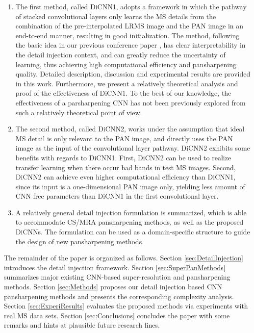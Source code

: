 \documentclass[journal]{IEEEtran}
\begin{document}
\begin{enumerate}
\item The first method, called DiCNN1, adopts a framework in which the pathway of stacked convolutional layers only learns the MS details from the combination of the pre-interpolated LRMS image and the PAN image in an end-to-end manner, resulting in good initialization. The method, following the basic idea in our previous conference paper \cite{rao2017residual}, has clear interpretability in the detail injection context, and can greatly reduce the uncertainty of learning, thus achieving high computational efficiency and pansharpening quality. Detailed description, discussion and experimental results are provided in this work. Furthermore, we present a relatively theoretical analysis and proof of the effectiveness of DiCNN1. To the best of our knowledge, the effectiveness of a parsharpening CNN has not been previously explored from such a relatively theoretical point of view.

          \item The second method, called DiCNN2, works under the assumption that ideal MS detail is only relevant to the PAN image, and directly uses the PAN image as the input of the convolutional layer pathway. DiCNN2 exhibits some benefits with regards to DiCNN1. First, DiCNN2 can be used to realize transfer learning when there occur bad bands in test MS images. Second, DiCNN2 can achieve even higher computational efficiency than DiCNN1, since its input is a one-dimensional PAN image only, yielding less amount of CNN free parameters than DiCNN1 in the first convolutional layer.

              \item A relatively general detail injection formulation is summarized, which is able to accommodate CS/MRA pansharpening methods, as well as the proposed DiCNNs. The formulation can be used as a domain-specific structure to guide the design of new pansharpening methods.

        \end{enumerate}

The remainder of the paper is organized as follows. Section \ref{sec:DetailInjection} introduces the detail injection framework. Section \ref{sec:SuperPanMethods} summarizes major existing CNN-based super-resolution and pansharpening methods. Section \ref{sec:Methods} proposes our detail injection based CNN pansharpening methods and presents the corresponding complexity analysis. Section \ref{sec:ExperiResults} evaluates the proposed methods via experiments with real MS data sets. Section \ref{sec:Conclusions} concludes the paper with some remarks and hints at plausible future research lines.
\end{document}
